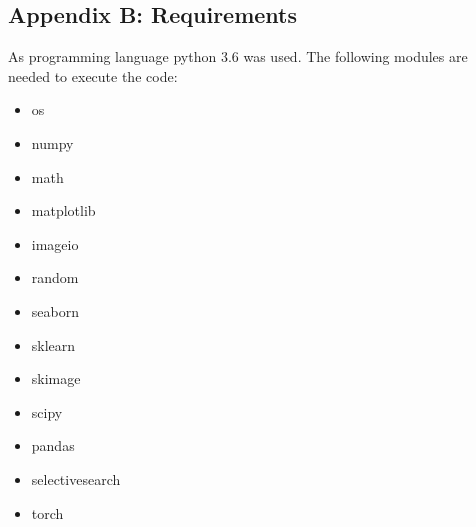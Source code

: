 \documentclass[12pt,a4paper,bibliography=totocnumbered,listof=totocnumbered]{scrartcl}
\begin{document}
\subsection{Appendix B: Requirements}
As programming language python 3.6 was used. The following modules are needed to execute the code:
\begin{itemize}
	\item os
	\item numpy
	\item math
	\item matplotlib
	\item imageio
	\item random
	\item seaborn
	\item sklearn
	\item skimage
	\item scipy
	\item pandas
	\item selectivesearch
	\item torch
\end{itemize}


\renewcommand\refname{References}


\pagebreak
\end{document}

